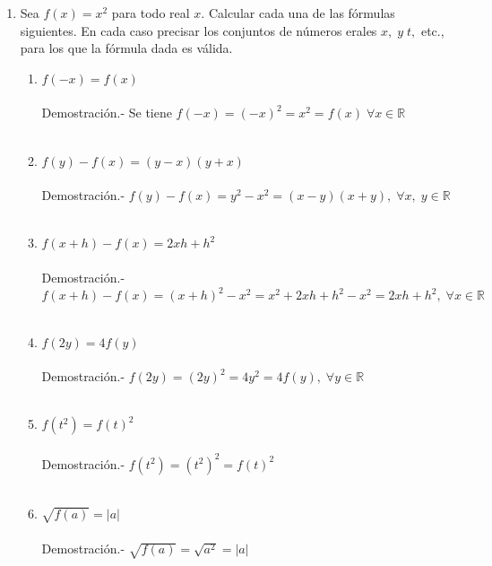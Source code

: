 \begin{enumerate}
        \item Sea $f(x)=x^2$  para todo real $x$. Calcular cada una de las fórmulas siguientes. En cada caso precisar los conjuntos de números erales $x, \; y \; t,$ etc., para los que la fórmula dada es válida.
            \begin{enumerate}[\bfseries (a)]
                \item $f(-x)=f(x)$ \\\\
                Demostración.- \; Se tiene $f(-x) = (-x)^2 = x^2 = f(x) \; \forall x \in \mathbb{R}$\\\\
                \item $f(y)-f(x)=(y-x)(y+x)$\\\\
                Demostración.- \; $f(y)-f(x)= y^2 - x^2 = (x-y)(x+y), \; \forall x, \; y \in \mathbb{R}$\\\\
                \item $f(x+h) - f(x) = 2xh + h^2$\\\\
                Demostración.- \; $f(x+h) - f(x) = (x+h)^2 -x^2 = x^2 + 2xh +h^2 - x^2 = 2xh + h^2, \; \forall x \in \mathbb{R}$\\\\
                \item $f(2y) = 4f(y)$\\\\
                Demostración.- \; $f(2y) = (2y)^2 = 4y^2 = 4 f(y), \; \forall y \in \mathbb{R}$\\\\
                \item $f(t^2)=f(t)^2$\\\\
                Demostración.- \; $f(t^2) = (t^2)^2 = f(t)^2$\\\\
                \item $\sqrt{f(a)} = |a|$\\\\
                Demostración.- \; $\sqrt{f(a)} = \sqrt{a^2} = |a|$\\\\
            \end{enumerate}


\end{enumerate}
